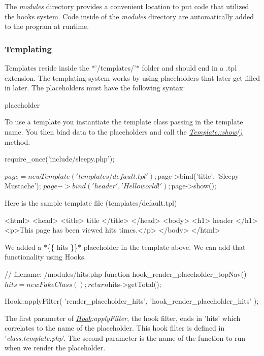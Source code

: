 The {\itshape modules} directory provides a convenient location to put code that utilized the hooks system. Code inside of the {\itshape modules} directory are automatically added to the program at runtime.

\subsubsection*{Templating}

Templates reside inside the $\ast$'/templates/'$\ast$ folder and should end in a .tpl extension. The templating system works by using placeholders that later get filled in later. The placeholders must have the following syntax\-: \begin{DoxyVerb}{{ placeholder }}
\end{DoxyVerb}


To use a template you instantiate the template class passing in the template name. You then bind data to the placeholders and call the {\itshape \hyperlink{class_template_a2b8e3779f5bd8c38f70307574859bd36}{Template\-::show()}} method. \begin{DoxyVerb}require_once('include/sleepy.php');

$page = new Template('templates/default.tpl');
$page->bind('title', 'Sleepy Mustache');
$page->bind('header', 'Hello world!');
$page->show();
\end{DoxyVerb}


Here is the sample template file (templates/default.\-tpl) \begin{DoxyVerb}<html>
    <head>
        <title>{{ title }}</title>
    </head>
    <body>
        <h1>{{ header }}</h1>
        <p>This page has been viewed {{ hits }} times.</p>
    </body>
</html>
\end{DoxyVerb}


We added a $\ast$\{\{ hits \}\}$\ast$ placeholder in the template above. We can add that functionality using Hooks. \begin{DoxyVerb}// filename: /modules/hits.php
function hook_render_placeholder_topNav() {
    $hits = new FakeClass();

    return $hits->getTotal();
}

Hook::applyFilter(
    'render_placeholder_hits',
    'hook_render_placeholder_hits'
);
\end{DoxyVerb}


The first parameter of {\itshape \hyperlink{class_hook}{Hook}\-:apply\-Filter}, the hook filter, ends in 'hits' which correlates to the name of the placeholder. This hook filter is defined in '{\itshape class.\-template.\-php}'. The second parameter is the name of the function to run when we render the placeholder.

